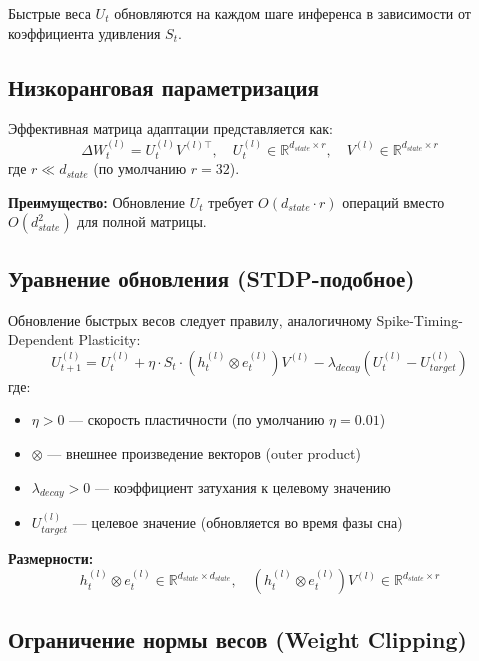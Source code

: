 Быстрые веса $U_t$ обновляются на каждом шаге инференса в зависимости от коэффициента удивления $S_t$.

\subsection{Низкоранговая параметризация}

Эффективная матрица адаптации представляется как:
\begin{equation}
\Delta W_t^{(l)} = U_t^{(l)} V^{(l)\top}, \quad U_t^{(l)} \in \mathbb{R}^{d_{state} \times r}, \quad V^{(l)} \in \mathbb{R}^{d_{state} \times r}
\label{eq:low_rank}
\end{equation}
где $r \ll d_{state}$ (по умолчанию $r = 32$).

\textbf{Преимущество:} Обновление $U_t$ требует $O(d_{state} \cdot r)$ операций вместо $O(d_{state}^2)$ для полной матрицы.

\subsection{Уравнение обновления (STDP-подобное)}

Обновление быстрых весов следует правилу, аналогичному Spike-Timing-Dependent Plasticity:
\begin{equation}
U_{t+1}^{(l)} = U_t^{(l)} + \eta \cdot S_t \cdot \left(h_t^{(l)} \otimes e_t^{(l)}\right) V^{(l)} - \lambda_{decay} \left(U_t^{(l)} - U_{target}^{(l)}\right)
\label{eq:plasticity}
\end{equation}
где:
\begin{itemize}
    \item $\eta > 0$ — скорость пластичности (по умолчанию $\eta = 0.01$)
    \item $\otimes$ — внешнее произведение векторов (outer product)
    \item $\lambda_{decay} > 0$ — коэффициент затухания к целевому значению
    \item $U_{target}^{(l)}$ — целевое значение (обновляется во время фазы сна)
\end{itemize}

\textbf{Размерности:}
\[
h_t^{(l)} \otimes e_t^{(l)} \in \mathbb{R}^{d_{state} \times d_{state}}, \quad \left(h_t^{(l)} \otimes e_t^{(l)}\right) V^{(l)} \in \mathbb{R}^{d_{state} \times r}
\]

\subsection{Ограничение нормы весов (Weight Clipping)}

